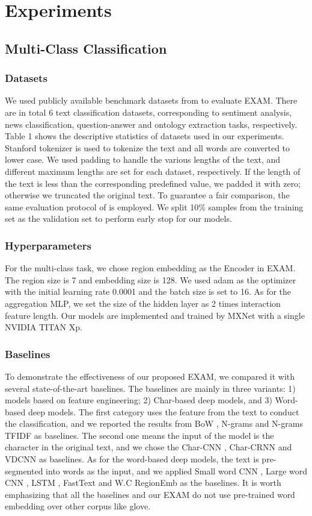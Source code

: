 \documentclass[letterpaper]{article} \usepackage{aaai19}  \usepackage{times}  \usepackage{helvet}  \usepackage{courier}  \usepackage{url}  \usepackage{graphicx}
\begin{document}
\section{Experiments}
\subsection{Multi-Class Classification}
\subsubsection{Datasets}
We used publicly available benchmark datasets from \cite{charcnn} to evaluate EXAM. There are in total 6 text classification datasets, corresponding to sentiment analysis, news classification, question-answer and ontology extraction tasks, respectively. Table 1 shows the descriptive statistics of datasets used in our experiments. Stanford tokenizer is used to tokenize the text and all words are converted to lower case. We used padding to handle the various lengths of the text, and different maximum lengths are set for each dataset, respectively. If the length of the text is less than the corresponding predefined value, we padded it with zero; otherwise we truncated the original text. To guarantee a fair comparison, the same evaluation protocol of \cite{charcnn} is employed. We split 10\% samples from the training set as the validation set to perform early stop for our models.

\subsubsection{Hyperparameters}
For the multi-class task, we chose region embedding as the Encoder in EXAM. The region size is 7 and embedding size is 128. We used adam \cite{adam} as the optimizer with the initial learning rate 0.0001 and the batch size is set to 16. As for the aggregation MLP, we set the size of the hidden layer as 2 times interaction feature length. Our models are implemented and trained by MXNet \cite{MXNet} with a single NVIDIA TITAN Xp.
\subsubsection{Baselines}
To demonstrate the effectiveness of our proposed EXAM, we compared it with several state-of-the-art baselines. The baselines are mainly in three variants: 1) models based on feature engineering; 2) Char-based deep models, and 3) Word-based deep models. The first category uses the feature from the text to conduct the classification, and we reported the results from BoW \cite{charcnn}, N-grams \cite{charcnn} and N-grams TFIDF \cite{charcnn} as baselines. The second one means the input of the model is the character in the original text, and we chose the Char-CNN \cite{charcnn}, Char-CRNN \cite{charcnn} and VDCNN \cite{vdcnn} as baselines. As for the word-based deep models, the text is pre-segmented into words as the input, and we applied Small word CNN \cite{charcnn}, Large word CNN \cite{charcnn}, LSTM \cite{charcnn}, FastText \cite{fasttext} and W.C RegionEmb \cite{regionemb} as the baselines.  It is worth emphasizing that all the baselines and our EXAM do not use pre-trained word embedding over other corpus like glove.
\end{document}
